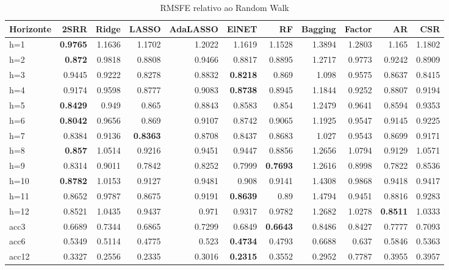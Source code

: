 \begin{table}[ht]
\centering
\caption{RMSFE relativo ao Random Walk}
\label{tab:rmsfe}
\begin{tabular}{lrrrrrrrrrr}
\hline
Horizonte & 2SRR & Ridge & LASSO & AdaLASSO & ElNET & RF & Bagging & Factor & AR & CSR \\
\hline
h=1 & \textbf{0.9765} & 1.1636 & 1.1702 & 1.2022 & 1.1619 & 1.1528 & 1.3894 & 1.2803 & 1.165 & 1.1802 \\
h=2 & \textbf{0.872} & 0.9818 & 0.8808 & 0.9466 & 0.8817 & 0.8895 & 1.2717 & 0.9773 & 0.9242 & 0.8909 \\
h=3 & 0.9445 & 0.9222 & 0.8278 & 0.8832 & \textbf{0.8218} & 0.869 & 1.098 & 0.9575 & 0.8637 & 0.8415 \\
h=4 & 0.9174 & 0.9598 & 0.8777 & 0.9083 & \textbf{0.8738} & 0.8945 & 1.1844 & 0.9252 & 0.8807 & 0.9194 \\
h=5 & \textbf{0.8429} & 0.949 & 0.865 & 0.8843 & 0.8583 & 0.854 & 1.2479 & 0.9641 & 0.8594 & 0.9353 \\
h=6 & \textbf{0.8042} & 0.9656 & 0.869 & 0.9107 & 0.8742 & 0.9065 & 1.1925 & 0.9547 & 0.9145 & 0.9225 \\
h=7 & 0.8384 & 0.9136 & \textbf{0.8363} & 0.8708 & 0.8437 & 0.8683 & 1.027 & 0.9543 & 0.8699 & 0.9171 \\
h=8 & \textbf{0.857} & 1.0514 & 0.9216 & 0.9451 & 0.9447 & 0.8856 & 1.2656 & 1.0794 & 0.9129 & 1.0571 \\
h=9 & 0.8314 & 0.9011 & 0.7842 & 0.8252 & 0.7999 & \textbf{0.7693} & 1.2616 & 0.8998 & 0.7822 & 0.8536 \\
h=10 & \textbf{0.8782} & 1.0153 & 0.9127 & 0.9481 & 0.908 & 0.9141 & 1.4308 & 0.9868 & 0.9418 & 0.9417 \\
h=11 & 0.8652 & 0.9787 & 0.8675 & 0.9191 & \textbf{0.8639} & 0.89 & 1.4794 & 0.9451 & 0.8816 & 0.9283 \\
h=12 & 0.8521 & 1.0435 & 0.9437 & 0.971 & 0.9317 & 0.9782 & 1.2682 & 1.0278 & \textbf{0.8511} & 1.0333 \\
acc3 & 0.6689 & 0.7344 & 0.6865 & 0.7299 & 0.6849 & \textbf{0.6643} & 0.8486 & 0.8427 & 0.7777 & 0.7093 \\
acc6 & 0.5349 & 0.5114 & 0.4775 & 0.523 & \textbf{0.4734} & 0.4793 & 0.6688 & 0.637 & 0.5846 & 0.5363 \\
acc12 & 0.3327 & 0.2556 & 0.2335 & 0.3016 & \textbf{0.2315} & 0.3552 & 0.2952 & 0.7787 & 0.3955 & 0.3957 \\
\hline
\end{tabular}
\end{table}
